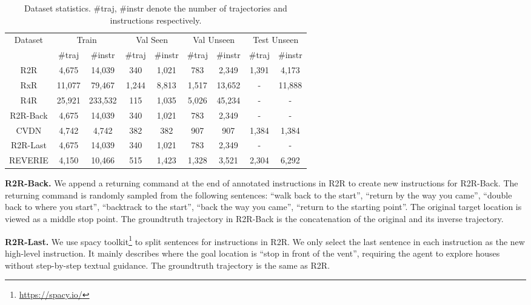 \begin{table}[h]
	\centering
	\small
	\caption{Dataset statistics. \#traj, \#instr  denote the number of trajectories and instructions respectively.}
	\label{tab:dataset_stats}
	\begin{tabular}{ccccccccc} \toprule
		\multirow{2}{*}{Dataset} & \multicolumn{2}{c}{Train} & \multicolumn{2}{c}{Val Seen} & \multicolumn{2}{c}{Val Unseen} & \multicolumn{2}{c}{Test Unseen} \\
		& \#traj & \#instr & \#traj & \#instr & \#traj & \#instr & \#traj & \#instr \\ \midrule
		R2R \cite{anderson2018vision} & 4,675 & 14,039 & 340 & 1,021 & 783 & 2,349 & 1,391 & 4,173 \\
		RxR \cite{ku2020room} & 11,077 & 79,467 & 1,244 & 8,813 & 1,517 & 13,652 & - & 11,888 \\ \midrule
		R4R \cite{jain2019stay} & 25,921 & 233,532 & 115 & 1,035 & 5,026 & 45,234 & - & - \\
		R2R-Back & 4,675 & 14,039 & 340 & 1,021 & 783 & 2,349 & - & - \\ \midrule
		CVDN \cite{thomason2020vision} & 4,742 & 4,742 & 382 & 382 & 907 & 907 & 1,384 & 1,384 \\ \midrule
		R2R-Last & 4,675 & 14,039 & 340 & 1,021 & 783 & 2,349 & - & - \\
		REVERIE \cite{qi2020reverie} & 4,150 & 10,466 & 515 & 1,423 & 1,328 & 3,521 & 2,304 & 6,292 \\ \bottomrule
	\end{tabular}
\end{table}


\noindent\textbf{R2R-Back.} We append a returning command at the end of annotated instructions in R2R to create new instructions for R2R-Back. The returning command is randomly sampled from the following sentences: ``walk back to the start'', ``return by the way you came'', ``double back to where you start'', ``backtrack to the start'', ``back the way you came'', ``return to the starting point''. The original target location is viewed as a middle stop point. The groundtruth trajectory in R2R-Back is the concatenation of the original and its inverse trajectory.

\noindent\textbf{R2R-Last.} We use spacy toolkit\footnote{\url{https://spacy.io/}} to split sentences for instructions in R2R. We only select the last sentence in each instruction as the new high-level instruction. It mainly describes where the goal location is \eg ``stop in front of the vent'', requiring the agent to explore houses without step-by-step textual guidance. The groundtruth trajectory is the same as R2R.

